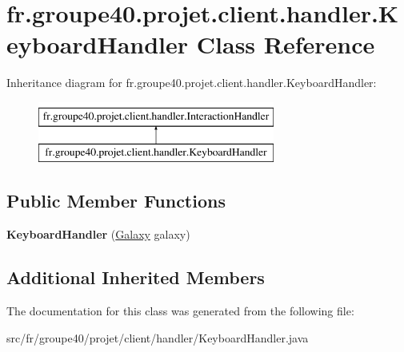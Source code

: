 \hypertarget{classfr_1_1groupe40_1_1projet_1_1client_1_1handler_1_1_keyboard_handler}{}\section{fr.\+groupe40.\+projet.\+client.\+handler.\+Keyboard\+Handler Class Reference}
\label{classfr_1_1groupe40_1_1projet_1_1client_1_1handler_1_1_keyboard_handler}
Inheritance diagram for fr.\+groupe40.\+projet.\+client.\+handler.\+Keyboard\+Handler\+:\begin{figure}[H]
\begin{center}
\leavevmode
\includegraphics[height=2.000000cm]{classfr_1_1groupe40_1_1projet_1_1client_1_1handler_1_1_keyboard_handler}
\end{center}
\end{figure}
\subsection*{Public Member Functions}
\begin{DoxyCompactItemize}
\item 
\mbox{\label{classfr_1_1groupe40_1_1projet_1_1client_1_1handler_1_1_keyboard_handler_a59005fc7e98f4ca737f595be00389670}} 
{\bfseries Keyboard\+Handler} (\hyperlink{classfr_1_1groupe40_1_1projet_1_1model_1_1board_1_1_galaxy}{Galaxy} galaxy)
\end{DoxyCompactItemize}
\subsection*{Additional Inherited Members}


The documentation for this class was generated from the following file\+:\begin{DoxyCompactItemize}
\item 
src/fr/groupe40/projet/client/handler/Keyboard\+Handler.\+java\end{DoxyCompactItemize}
